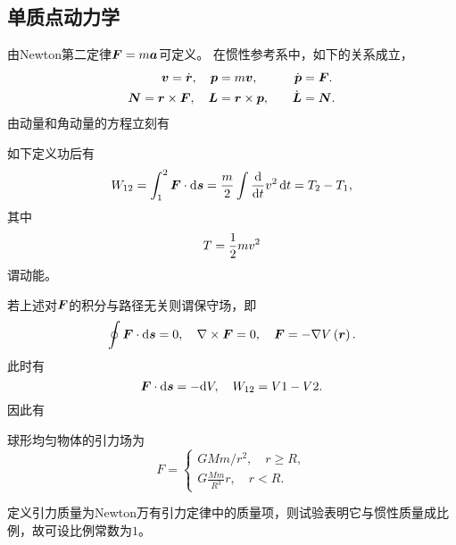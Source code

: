 \documentclass{ctexrep}
\begin{document}
\subsection{单质点动力学}
由Newton第二定律$\boldsymbol{F}=m\boldsymbol{a}$可定义。
在惯性参考系中，如下的关系成立，
\begin{alignat*}{3}
\boldsymbol{v}=\dot{\boldsymbol{r}}, \quad \boldsymbol{p} &= m\boldsymbol{v}, \quad &\dot{\boldsymbol{p}}&=\boldsymbol{F}.\\
\boldsymbol{N}=\boldsymbol{r}\times\boldsymbol{F}, \quad \boldsymbol{L} &= \boldsymbol{r}\times\boldsymbol{p}, \quad &\dot{\boldsymbol{L}}&=\boldsymbol{N}.
\end{alignat*}
由动量和角动量的方程立刻有
\par
如下定义功后有
\[ W_{12}=\int_1^2\boldsymbol{F}\cdot\mathrm{d} \boldsymbol{s}=\frac{m}{2}\int\frac{\mathrm{d}}{\mathrm{d} t} v^2\, \mathrm{d} t=T_2-T_1, \]
其中
\[ T=\frac{1}{2} mv^2 \]
谓动能。
\par
若上述对$\boldsymbol{F}$的积分与路径无关则谓保守场，即
\[ \oint\boldsymbol{F}\cdot\mathrm{d} \boldsymbol{s}=0, \quad \nabla\times\boldsymbol{F}=0, \quad \boldsymbol{F}=-\nabla V\left(\boldsymbol{r}\right). \]
此时有
\[ \boldsymbol{F}\cdot\mathrm{d} \boldsymbol{s} = -\mathrm{d} V, \quad W_{12}=V1-V2. \]
因此有
\begin{ex}
  球形均匀物体的引力场为
  \[ F = \begin{cases}
    GMm/r^2, \quad r \ge R,\\
    G\frac{Mm}{R^3}r, \quad r < R.
  \end{cases} \]
\end{ex}
\begin{remark}
  定义引力质量为Newton万有引力定律中的质量项，则试验表明它与惯性质量成比例，故可设比例常数为$1$。
\end{remark}
\end{document}
